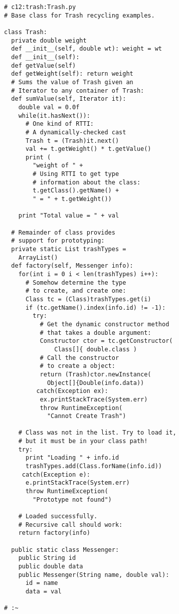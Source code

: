 \begin{lstlisting} 
# c12:trash:Trash.py 
# Base class for Trash recycling examples. 

class Trash: 
  private double weight 
  def __init__(self, double wt): weight = wt  
  def __init__(self): 
  def getValue(self) 
  def getWeight(self): return weight  
  # Sums the value of Trash given an 
  # Iterator to any container of Trash: 
  def sumValue(self, Iterator it): 
    double val = 0.0f 
    while(it.hasNext()): 
      # One kind of RTTI: 
      # A dynamically-checked cast 
      Trash t = (Trash)it.next() 
      val += t.getWeight() * t.getValue() 
      print ( 
        "weight of " + 
        # Using RTTI to get type 
        # information about the class: 
        t.getClass().getName() + 
        " = " + t.getWeight()) 
        
    print "Total value = " + val 
    
  # Remainder of class provides  
  # support for prototyping: 
  private static List trashTypes =  
    ArrayList() 
  def factory(self, Messenger info): 
    for(int i = 0 i < len(trashTypes) i++): 
      # Somehow determine the type 
      # to create, and create one: 
      Class tc = (Class)trashTypes.get(i) 
      if (tc.getName().index(info.id) != -1): 
        try: 
          # Get the dynamic constructor method 
          # that takes a double argument: 
          Constructor ctor = tc.getConstructor( 
              Class[]{ double.class ) 
          # Call the constructor   
          # to create a object: 
          return (Trash)ctor.newInstance( 
            Object[]{Double(info.data)) 
         catch(Exception ex): 
          ex.printStackTrace(System.err) 
          throw RuntimeException( 
            "Cannot Create Trash") 
            
    # Class was not in the list. Try to load it, 
    # but it must be in your class path! 
    try: 
      print "Loading " + info.id 
      trashTypes.add(Class.forName(info.id)) 
     catch(Exception e): 
      e.printStackTrace(System.err) 
      throw RuntimeException( 
        "Prototype not found") 
        
    # Loaded successfully.  
    # Recursive call should work: 
    return factory(info) 
    
  public static class Messenger: 
    public String id 
    public double data 
    public Messenger(String name, double val): 
      id = name 
      data = val 
      
# :~ 
\end{lstlisting}

